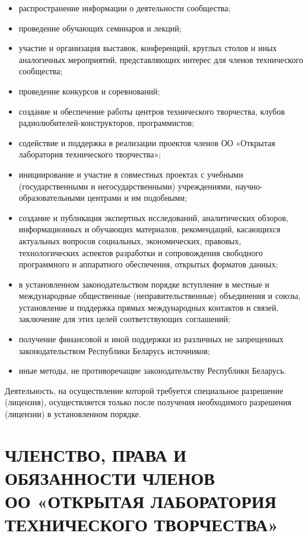 \documentclass[a4paper,fontsize=14pt,titlepage]{scrartcl}
\newcommand{\OOname}{«Открытая лаборатория технического творчества»}
\newcommand{\OONAME}{«ОТКРЫТАЯ ЛАБОРАТОРИЯ ТЕХНИЧЕСКОГО ТВОРЧЕСТВА»}
\newcommand{\OO}{ОО \OOname}
\begin{document}
\begin{itemize}
\item распространение информации о деятельности сообщества;
\item проведение обучающих семинаров и лекций;
\item участие и организация выставок, конференций, круглых столов и иных аналогичных мероприятий, представляющих интерес для
членов технического сообщества;
\item проведение конкурсов и соревнований;
\item создание и обеспечение работы центров технического творчества,
клубов радиолюбителей-конструкторов, программистов;
\item содействие и поддержка в реализации проектов членов \OO;
\item инициирование и участие в совместных проектах с учебными (государственными и негосударственными) учреждениями,
научно-образовательными центрами и им подобными;
\item создание и публикация экспертных исследований, аналитических обзоров,
информационных и обучающих материалов, рекомендаций, касающихся актуальных вопросов социальных,
экономических, правовых, технологических аспектов разработки и сопровождения свободного программного и аппаратного обеспечения,
открытых форматов данных;
\item в установленном законодательством порядке вступление в местные и международные
общественные (неправительственные) объединения и союзы,
установление и поддержка прямых международных контактов и связей,
заключение для этих целей соответствующих соглашений;
\item получение финансовой и иной поддержки из различных не запрещенных законодательством Республики Беларусь источников;
\item иные методы, не противоречащие законодательству Республики Беларусь.
\end{itemize}
Деятельность, на осуществление которой требуется специальное разрешение (лицензия),
осуществляется только после получения необходимого разрешения (лицензии) в установленном порядке.




\newpage\section{ЧЛЕНСТВО, ПРАВА И ОБЯЗАННОСТИ ЧЛЕНОВ\\ ОО \OONAME}
\end{document}

